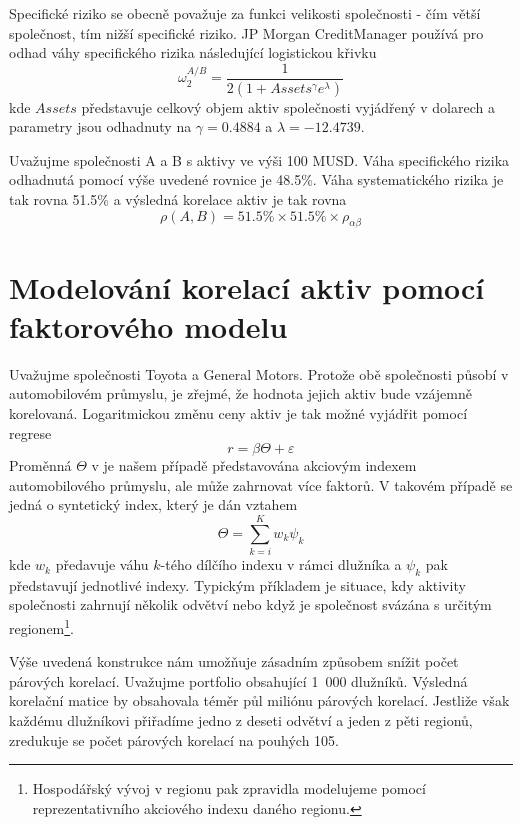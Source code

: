 Specifické riziko se obecně považuje za funkci velikosti společnosti - čím větší společnost, tím nižší specifické riziko. JP Morgan CreditManager používá pro odhad váhy specifického rizika následující logistickou křivku
\begin{equation*}
\omega_2^{A/B} = \frac{1}{2(1 + Assets^{\gamma} e^{\lambda})}
\end{equation*}
kde $Assets$ představuje celkový objem aktiv společnosti vyjádřený v dolarech a parametry jsou odhadnuty na $\gamma = 0.4884$ a $\lambda = -12.4739$.

\begin{example}
Uvažujme společnosti A a B s aktivy ve výši 100 MUSD. Váha specifického rizika odhadnutá pomocí výše uvedené rovnice je 48.5\%. Váha systematického rizika je tak rovna 51.5\% a výsledná korelace aktiv je tak rovna
\begin{equation*}
\rho(A, B) = 51.5\% \times 51.5\% \times \rho_{\alpha \beta}
\end{equation*}
\end{example}

\section{Modelování korelací aktiv pomocí faktorového modelu}

Uvažujme společnosti Toyota a General Motors. Protože obě společnosti působí v automobilovém průmyslu, je zřejmé, že hodnota jejich aktiv bude vzájemně korelovaná. Logaritmickou změnu ceny aktiv je tak možné vyjádřit pomocí regrese
\begin{equation}
r = \beta \Theta + \varepsilon
\end{equation}
Proměnná $\Theta$ v je našem případě představována akciovým indexem automobilového průmyslu, ale může zahrnovat více faktorů. V takovém případě se jedná o syntetický index, který je dán vztahem
\begin{equation}
\Theta = \sum_{k = i}^K w_k \psi_k
\end{equation}
kde $w_k$ předavuje váhu $k$-tého dílčího indexu v rámci dlužníka a $\psi_k$ pak představují jednotlivé indexy. Typickým příkladem je situace, kdy aktivity společnosti zahrnují několik odvětví nebo když je společnost svázána s určitým regionem\footnote{Hospodářský vývoj v regionu pak zpravidla modelujeme pomocí reprezentativního akciového indexu daného regionu.}.

Výše uvedená konstrukce nám umožňuje zásadním způsobem snížit počet párových korelací. Uvažujme portfolio obsahující 1~000 dlužníků. Výsledná korelační matice by obsahovala téměr půl miliónu párových korelací. Jestliže však každému dlužníkovi přiřadíme jedno z deseti odvětví a jeden z pěti regionů, zredukuje se počet párových korelací na pouhých 105.


